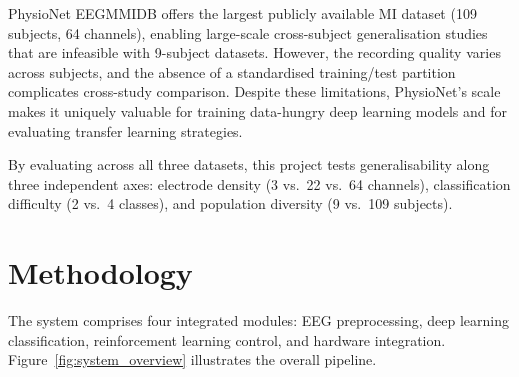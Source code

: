 \documentclass[12pt, a4paper]{article}
\begin{document}
PhysioNet EEGMMIDB offers the largest publicly available MI dataset (109 subjects, 64 channels), enabling large-scale cross-subject generalisation studies that are infeasible with 9-subject datasets. However, the recording quality varies across subjects, and the absence of a standardised training/test partition complicates cross-study comparison. Despite these limitations, PhysioNet's scale makes it uniquely valuable for training data-hungry deep learning models and for evaluating transfer learning strategies.

By evaluating across all three datasets, this project tests generalisability along three independent axes: electrode density (3 vs.\ 22 vs.\ 64 channels), classification difficulty (2 vs.\ 4 classes), and population diversity (9 vs.\ 109 subjects).

\section{Methodology}

The system comprises four integrated modules: EEG preprocessing, deep learning classification, reinforcement learning control, and hardware integration. Figure~\ref{fig:system_overview} illustrates the overall pipeline.
\end{document}
